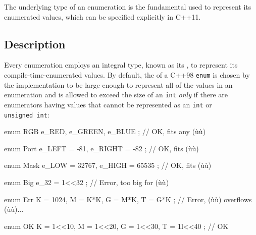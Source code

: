 


\setcounter{table}{0}
\setcounter{footnote}{0}
\setcounter{lstlisting}{0}


The underlying type of an enumeration is the fundamental
 used to represent its enumerated values, which
can be specified explicitly in C++11.

\subsection[Description]{Description}\label{description}

Every enumeration employs an integral type, known as its
, to represent its compile-time-enumerated
values. By default, the  of a C++98
\lstinline!enum! is chosen by the
implementation to be large enough to represent all of the values in an
enumeration and is allowed to exceed the size of an \lstinline!int!
\emph{only} if there are enumerators having values that cannot be
represented as an \lstinline!int! or \lstinline!unsigned!~\lstinline!int!:

\begin{emcppslisting}
enum RGB { e_RED, e_GREEN, e_BLUE };                     // OK, fits any (ù{}ù)

enum Port { e_LEFT = -81, e_RIGHT = -82 };               // OK, fits (ù{}ù)

enum Mask { e_LOW = 32767, e_HIGH = 65535 };             // OK, fits (ù{}ù)

enum Big { e_32 = 1<<32 };                               // Error, too big for (ù{}ù)

enum Err { K = 1024, M = K*K, G = M*K, T = G*K };        // Error, (ù{}ù) overflows (ù{}ù)...

enum OK { K = 1<<10, M = 1<<20, G = 1<<30, T = 1l<<40 }; // OK
\end{emcppslisting}

